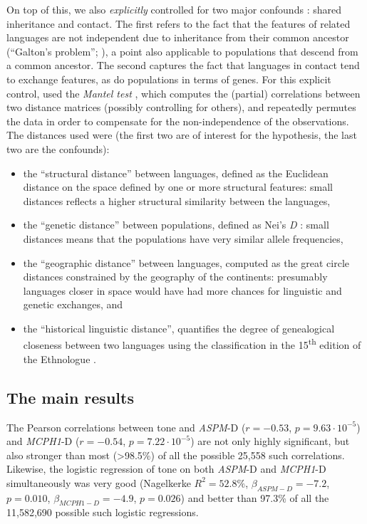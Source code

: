 \documentclass[twoside,twocolumn]{article}
\begin{document}
On top of this, we also \emph{explicitly} controlled for two major confounds \citep{ladd_correlational_2015}: shared inheritance and contact.
The first refers to the fact that the features of related languages are not independent due to inheritance from their common ancestor (``Galton's problem''; \citealp{mace_galtonproblem_1994}), a point also applicable to populations that descend from a common ancestor.
The second captures the fact that languages in contact tend to exchange features, as do populations in terms of genes.
For this explicit control, \citet{dediu_ladd_2007} used the \emph{Mantel test} \citep{mantel_detection_1967}, which computes the (partial) correlations between two distance matrices (possibly controlling for others), and repeatedly permutes the data in order to compensate for the non-independence of the observations.
The distances used were (the first two are of interest for the hypothesis, the last two are the confounds):

\begin{itemize}
	\item the ``structural distance'' between languages, defined as the Euclidean distance on the space defined by one or more structural features: small distances reflects a higher structural similarity between the languages,
	\item the ``genetic distance'' between populations, defined as Nei’s \textit{D} \citep{nei_genetic_1972}: small distances means that the populations have very similar allele frequencies,
	\item the ``geographic distance'' between languages, computed as the great circle distances constrained by the geography of the continents: presumably languages closer in space would have had more chances for linguistic and genetic exchanges, and
	\item the ``historical linguistic distance'', quantifies the degree of genealogical closeness between two languages using the classification in the 15\textsuperscript{th} edition of the Ethnologue \citep{gordon_ethnologue15_2005}.
\end{itemize}

\subsection{The main results}

The Pearson correlations between tone and \textit{ASPM}-D ($r = -0.53$, $p = 9.63\cdot10^{-5}$) and \textit{MCPH1}-D ($r = -0.54$, $p = 7.22\cdot10^{-5}$) are not only highly significant, but also stronger than most (>98.5\%) of all the possible 25,558 such correlations.
Likewise, the logistic regression of tone on both \textit{ASPM}-D and \textit{MCPH1}-D simultaneously was very good (Nagelkerke $R^2 = 52.8\%$, $\beta_{ASPM-D} = -7.2$, $p = 0.010$, $\beta_{MCPH1-D} = -4.9$, $p = 0.026$) and better than 97.3\% of all the 11,582,690 possible such logistic regressions.
\end{document}
